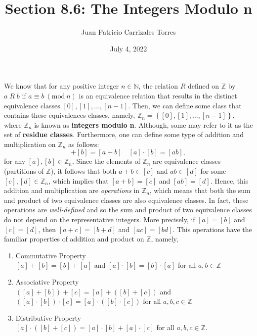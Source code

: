 \documentclass[12pt]{article}
\newcommand{\N}{\mathbb{N}}
\newcommand{\Z}{\mathbb{Z}}
\newcommand{\Mod}[1]{\ (\mathrm{mod}\ #1)}
\begin{document}
  
 \title{Section 8.6: The Integers Modulo n}
  \author{Juan Patricio Carrizales Torres}
   \date{July 4, 2022}
     \maketitle
	
     We know that for any positive integer $n\in \N$, the relation $R$ defined on $\Z$ by $a\; R\; b$ if $a\equiv b \Mod n$ is an equivalence relation that results in the distinct equivalence classes $[0],[1],\dots,[n-1]$. Then, we can define some class that contains these equivalences classes, namely, $\Z_{n} = \left\{ [0],[1],\dots,[n-1] \right\}$, where $\Z_{n}$ is known as \textbf{integers modulo n}. Although, some may refer to it as the set of \textbf{residue classes}.
     Furthermore, one can define some type of addition and multiplication on $\Z_{n}$ as follows:
     \begin{equation*}
       [a]+[b] = [a+b] \quad [a]\cdot[b] = [ab],
     \end{equation*}
	for any $[a],[b]\in \Z_{n}$. Since the elements of $\Z_{n}$ are equivalence classes (partitions of $\Z$), it follows that both $a+b\in [c]$ and $ab\in [d]$ for some $[c],[d]\in\Z_{n}$, which implies that $[a+b]=[c]$ and $[ab]=[d]$. Hence, this addition and multiplication are \textit{operations} in $\Z_{n}$, which means that both the sum and product of two equivalence classes are also equivalence classes. In fact, these operations are \textit{well-defined} and so the sum and product of two equivalence classes do not depend on the representative integers. More precisely, if $[a]=[b]$ and $[c]=[d]$, then $[a+c] = [b+d]$ and $[ac]=[bd]$.
	This operations have the familiar properties of addition and product on $\Z$, namely, 
	\begin{enumerate}[label=(\alph*)]
	  \item Commutative Property\\
	  $[a]+[b]=[b]+[a]$ and $[a]\cdot[b] = [b]\cdot[a]$ for all $a,b\in \Z$\\

	\item Associative Property\\
	  $([a]+[b])+[c] = [a] + ([b]+[c])$ and $([a]\cdot[b])\cdot[c] = [a]\cdot([b]\cdot[c])$ for all $a,b,c\in \Z$\\

	\item Distributive Property\\
	  $[a]\cdot([b]+[c]) = [a]\cdot[b]+[a]\cdot[c]$ for all $a,b,c\in \Z$.
       \end{enumerate}
\end{document}
